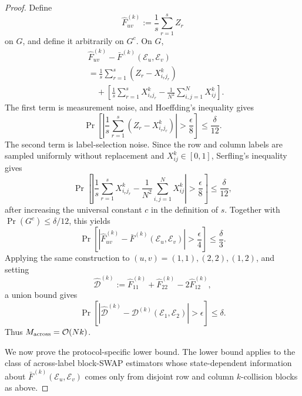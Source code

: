 \documentclass[aps,prx,reprint,superscriptaddress,amsmath,amssymb,longbibliography,floatfix]{revtex4-2}
\newcommand{\Abs}[1]{\left\lvert #1\right\rvert}
\newcommand{\scD}{\mathcal{D}}
\newcommand{\scE}{\mathcal{E}}
\newcommand{\scO}{\mathcal{O}}
\theoremstyle{plain}
\theoremstyle{definition}
\theoremstyle{remark}
\begin{document}
\begin{proof}
Define
\begin{equation}
    \widehat F_{uv}^{(k)}
    :=
    \frac1s\sum_{r=1}^s Z_r
\label{eq:app-large-k-estimator}
\end{equation}
on \(G\), and define it arbitrarily on \(G^c\). On \(G\),
\begin{equation}
\begin{aligned}
&\widehat F_{uv}^{(k)}-\bar F^{(k)}(\scE_u,\scE_v)\\
    &=
    \frac1s\sum_{r=1}^s
    \left(Z_r-X_{i_rj_r}^k\right)\\
    &\quad+
    \left[
        \frac1s\sum_{r=1}^s X_{i_rj_r}^k
        -
        \frac1{N^2}\sum_{i,j=1}^N X_{ij}^k
    \right].
\end{aligned}
\label{eq:app-large-k-error-decomposition}
\end{equation}
The first term is measurement noise, and Hoeffding's inequality gives
\[
    \Pr\!\left[
        \Abs{
            \frac1s\sum_{r=1}^s
            \left(Z_r-X_{i_rj_r}^k\right)
        }
        >
        \frac{\epsilon}{8}
    \right]
    \le
    \frac{\delta}{12}.
\]
The second term is label-selection noise. Since the row and column labels are sampled
uniformly without replacement and \(X_{ij}^k\in[0,1]\), Serfling's inequality gives
\[
    \Pr\!\left[
        \Abs{
            \frac1s\sum_{r=1}^s X_{i_rj_r}^k
            -
            \frac1{N^2}\sum_{i,j=1}^N X_{ij}^k
        }
        >
        \frac{\epsilon}{8}
    \right]
    \le
    \frac{\delta}{12},
\]
after increasing the universal constant \(c\) in the definition of \(s\). Together with
\(\Pr(G^c)\le\delta/12\), this yields
\[
    \Pr\!\left[
        \Abs{
            \widehat F_{uv}^{(k)}
            -
            \bar F^{(k)}(\scE_u,\scE_v)
        }
        >
        \frac{\epsilon}{4}
    \right]
    \le
    \frac{\delta}{3}.
\]
Applying the same construction to \((u,v)=(1,1),(2,2),(1,2)\), and setting
\[
    \widehat{\scD}^{(k)}
    :=
    \widehat F_{11}^{(k)}
    +
    \widehat F_{22}^{(k)}
    -
    2\widehat F_{12}^{(k)},
\]
a union bound gives
\begin{equation}
    \Pr\!\left[
        \Abs{
            \widehat{\scD}^{(k)}
            -
            \scD^{(k)}(\scE_1,\scE_2)
        }
        >
        \epsilon
    \right]
    \le
    \delta.
\label{eq:app-large-k-estimation-guarantee}
\end{equation}
Thus \(M_{\rm across}=\scO(Nk)\).

We now prove the protocol-specific lower bound. The lower bound applies to the class of
across-label block-SWAP estimators whose state-dependent information about
\(\bar F^{(k)}(\scE_u,\scE_v)\) comes only from disjoint row and column \(k\)-collision
blocks as above.


\end{proof}
\end{document}
